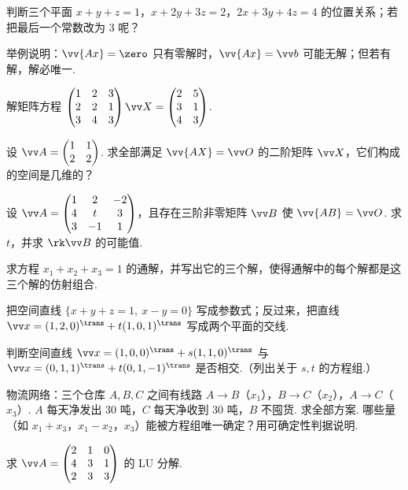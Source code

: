 {\begin{exA}
			\item\label{ex:sol:A8} 判断三个平面 $x+y+z=1$，$x+2y+3z=2$，$2x+3y+4z=4$ 的位置关系；若把最后一个常数改为 $3$ 呢？
			\item\label{ex:sol:A9} 举例说明：$\vv{Ax}=\zero$ 只有零解时，$\vv{Ax}=\vv b$ 可能无解；但若有解，解必唯一.
			\item\label{ex:sol:A10} 解矩阵方程 $\begin{pmatrix}1&2&3\\2&2&1\\3&4&3\end{pmatrix}\vv X=\begin{pmatrix}2&5\\3&1\\4&3\end{pmatrix}$.
			\item\label{ex:sol:A11} 设 $\vv A=\begin{pmatrix}1&1\\2&2\end{pmatrix}$. 求全部满足 $\vv{AX}=\vv O$ 的二阶矩阵 $\vv X$，它们构成的空间是几维的？
			\item\label{ex:sol:A12} 设 $\vv A=\begin{pmatrix}1&2&-2\\4&t&3\\3&-1&1\end{pmatrix}$，且存在三阶非零矩阵 $\vv B$ 使 $\vv{AB}=\vv O$. 求 $t$，并求 $\rk\vv B$ 的可能值.
			\item\label{ex:sol:A13} 求方程 $x_1+x_2+x_3=1$ 的通解，并写出它的三个解，使得通解中的每个解都是这三个解的仿射组合.
			\item\label{ex:sol:A14} 把空间直线 $\{x+y+z=1,\ x-y=0\}$ 写成参数式；反过来，把直线 $\vv x=(1,2,0)^\trans+t(1,0,1)^\trans$ 写成两个平面的交线.
			\item\label{ex:sol:A15} 判断空间直线 $\vv x=(1,0,0)^\trans+s(1,1,0)^\trans$ 与 $\vv x=(0,1,1)^\trans+t(0,1,-1)^\trans$ 是否相交.（列出关于 $s,t$ 的方程组.）
			\item\label{ex:sol:A16} 物流网络：三个仓库 $A,B,C$ 之间有线路 $A\to B$（$x_1$），$B\to C$（$x_2$），$A\to C$（$x_3$）. $A$ 每天净发出 $30$ 吨，$C$ 每天净收到 $30$ 吨，$B$ 不囤货. 求全部方案. 哪些量（如 $x_1+x_3$，$x_1-x_2$，$x_3$）能被方程组唯一确定？用可确定性判据说明.
			\item\label{ex:sol:A17} 求 $\vv A=\begin{pmatrix}2&1&0\\4&3&1\\2&3&3\end{pmatrix}$ 的 LU 分解.

\end{exA}}

